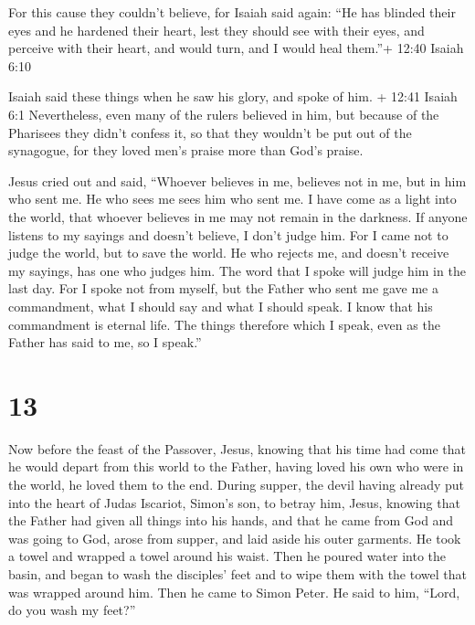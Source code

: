  For this cause they couldn't believe, for Isaiah said
again:  ``He has blinded their eyes and he hardened their
heart, lest they should see with their eyes, and perceive with their
heart, and would turn, and I would heal them.''+ 12:40 Isaiah 6:10

 Isaiah said these things when he saw his glory, and spoke
of him. + 12:41 Isaiah 6:1  Nevertheless, even many of the
rulers believed in him, but because of the Pharisees they didn't confess
it, so that they wouldn't be put out of the synagogue,  for
they loved men's praise more than God's praise.

 Jesus cried out and said, ``Whoever believes in me,
believes not in me, but in him who sent me.  He who sees me
sees him who sent me.  I have come as a light into the
world, that whoever believes in me may not remain in the darkness.
 If anyone listens to my sayings and doesn't believe, I
don't judge him. For I came not to judge the world, but to save the
world.  He who rejects me, and doesn't receive my sayings,
has one who judges him. The word that I spoke will judge him in the last
day.  For I spoke not from myself, but the Father who sent
me gave me a commandment, what I should say and what I should speak.
 I know that his commandment is eternal life. The things
therefore which I speak, even as the Father has said to me, so I
speak.''

\hypertarget{section-12}{%
\section{13}\label{section-12}}

 Now before the feast of the Passover, Jesus, knowing that
his time had come that he would depart from this world to the Father,
having loved his own who were in the world, he loved them to the end.
 During supper, the devil having already put into the heart
of Judas Iscariot, Simon's son, to betray him,  Jesus,
knowing that the Father had given all things into his hands, and that he
came from God and was going to God,  arose from supper, and
laid aside his outer garments. He took a towel and wrapped a towel
around his waist.  Then he poured water into the basin, and
began to wash the disciples' feet and to wipe them with the towel that
was wrapped around him.  Then he came to Simon Peter. He
said to him, ``Lord, do you wash my feet?''

